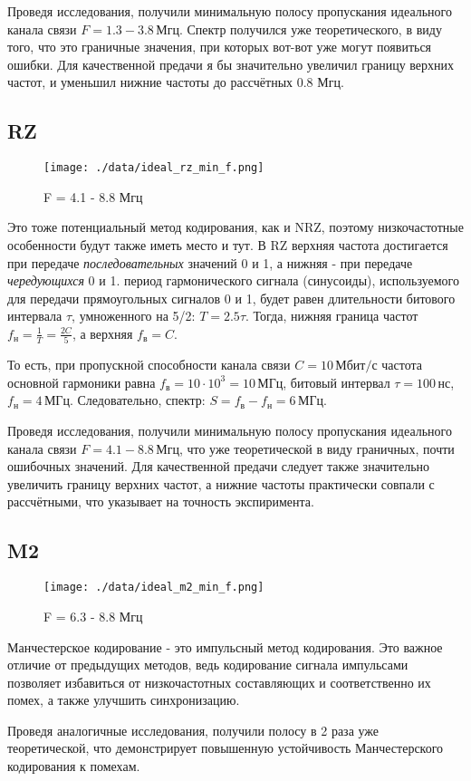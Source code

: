 Проведя исследования, получили минимальную полосу пропускания идеального канала связи $F = 1.3 - 3.8 \, \text{Мгц}$. Спектр получился уже теоретического, в виду того, что это граничные значения, при которых вот-вот уже могут появиться ошибки. Для качественной предачи я бы значительно увеличил границу верхних частот, и уменьшил нижние частоты до рассчётных 0.8 Мгц.

\subsection{RZ}

\begin{wrapfigure}{r}{0.6\textwidth}
	\centering
	\texttt{[image: ./data/ideal\_rz\_min\_f.png]}
	\caption{F = 4.1 - 8.8 Мгц}
\end{wrapfigure}

Это тоже потенциальный метод кодирования, как и NRZ, поэтому низкочастотные особенности будут также иметь место и тут. В RZ верхняя частота достигается при передаче \textit{последовательных} значений 0 и 1, а нижняя - при передаче \textit{чередующихся} 0 и 1. период гармонического сигнала (синусоиды), используемого для передачи прямоугольных сигналов 0 и 1, будет равен длительности битового интервала $\tau$, умноженного на 5/2: $T = 2.5 \tau$. Тогда, нижняя граница частот $f_{\text{н}} = \frac{1}{T} = \frac{2C}{5}$, а верхняя $f_{\text{в}} = C$.


То есть, при пропускной способности канала связи $C = 10 \, \text{Мбит/с}$ частота основной гармоники равна $f_{\text{в}} = 10 \cdot 10^3 = 10 \, \text{МГц}$, битовый интервал $\tau = 100 \, \text{нс}$, $f_{\text{н}} = 4 \, \text{МГц}$. Следовательно, спектр: $S = f_{\text{в}} - f_{\text{н}} = 6 \, \text{МГц}$.

Проведя исследования, получили минимальную полосу пропускания идеального канала связи $F = 4.1 - 8.8 \, \text{Мгц}$, что уже теоретической в виду граничных, почти ошибочных значений. Для качественной предачи следует также значительно увеличить границу верхних частот, а нижние частоты практически совпали с рассчётными, что указывает на точность экспиримента.

\subsection{M2}

\begin{wrapfigure}{l}{0.58\textwidth}
	\centering
	\texttt{[image: ./data/ideal\_m2\_min\_f.png]}
	\caption{F = 6.3 - 8.8 Мгц}
\end{wrapfigure}

\vspace{-0mm}
Манчестерское кодирование - это импульсный метод кодирования. Это важное отличие от предыдущих методов, ведь кодирование сигнала импульсами позволяет избавиться от низкочастотных составляющих и соответственно их помех, а также улучшить синхронизацию.

Проведя аналогичные исследования, получили полосу в 2 раза уже теоретической, что демонстрирует повышенную устойчивость Манчестерского кодирования к помехам.

